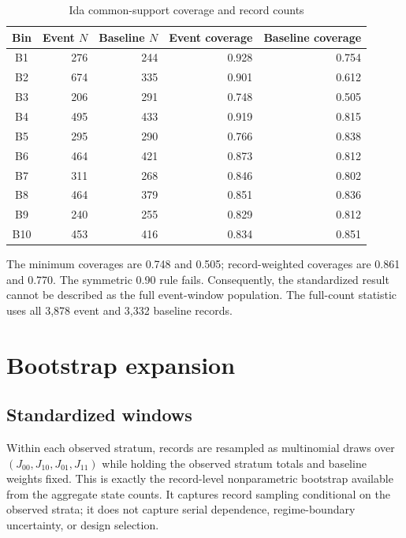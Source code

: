 \documentclass[11pt]{article}
\begin{document}
\begin{table}[t]
\centering
\caption{Ida common-support coverage and record counts}
\label{tab:coverage}
\begin{tabular}{@{}crrrr@{}}
\toprule
Bin & Event $N$ & Baseline $N$ & Event coverage & Baseline coverage \\
\midrule
B1 & 276 & 244 & 0.928 & 0.754 \\
B2 & 674 & 335 & 0.901 & 0.612 \\
B3 & 206 & 291 & 0.748 & 0.505 \\
B4 & 495 & 433 & 0.919 & 0.815 \\
B5 & 295 & 290 & 0.766 & 0.838 \\
B6 & 464 & 421 & 0.873 & 0.812 \\
B7 & 311 & 268 & 0.846 & 0.802 \\
B8 & 464 & 379 & 0.851 & 0.836 \\
B9 & 240 & 255 & 0.829 & 0.812 \\
B10 & 453 & 416 & 0.834 & 0.851 \\
\bottomrule
\end{tabular}
\end{table}

The minimum coverages are 0.748 and 0.505; record-weighted coverages are 0.861 and 0.770. The symmetric 0.90 rule fails. Consequently, the standardized result cannot be described as the full event-window population. The full-count statistic uses all 3,878 event and 3,332 baseline records.

\section{Bootstrap expansion}

\subsection{Standardized windows}

Within each observed stratum, records are resampled as multinomial draws over $(J_{00},J_{10},J_{01},J_{11})$ while holding the observed stratum totals and baseline weights fixed. This is exactly the record-level nonparametric bootstrap available from the aggregate state counts. It captures record sampling conditional on the observed strata; it does not capture serial dependence, regime-boundary uncertainty, or design selection.
\end{document}
